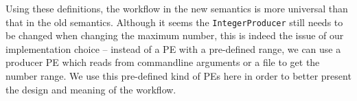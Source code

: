 Using these definitions, the workflow in the new semantics is more universal than that in the old semantics. Although it seems the \lstinline|IntegerProducer| still needs to be changed when changing the maximum number, this is indeed the issue of our implementation choice -- instead of a PE with a pre-defined range, we can use a producer PE which reads from commandline arguments or a file to get the number range. We use this pre-defined kind of PEs here in order to better present the design and meaning of the workflow.
